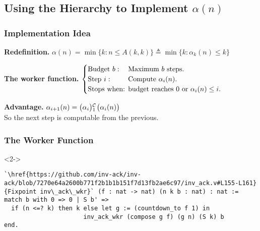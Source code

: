 \subsection{Using the Hierarchy to Implement $\alpha(n)$}
\begin{frame}
\frametitle{Implementation Idea}
\textbf{Redefinition.}
$
\alpha(n) = \min\{k: n\le A(k, k) \} \triangleq \min\{k: \alpha_k(n)\le k \}
$

\bigskip

\pause 
\textbf{The worker function.} $\begin{cases}
\text{Budget } b: & \hspace{-1em}\text{Maximum } b \text{ steps. } \\
\text{Step } i: & \hspace{-1em}\text{Compute } \alpha_i(n). \\
\text{Stops when: } & \hspace{-1em}\text{budget reaches } 0 \text{ or } \alpha_i(n) \le i.
\end{cases}$


\bigskip

\pause 
\textbf{Advantage.} $\alpha_{i+1}(n) = \cdt{\big(\alpha_i\big)}{1}\big(\alpha_i(n)\big)$\\
\smallskip
So the next step is computable from the previous.
\end{frame}


\begin{frame}[fragile]
\frametitle{The Worker Function}


\bigskip

\begin{overlayarea}{\linewidth}{3cm}
\begin{onlyenv}<2->
	\begin{lstlisting}
`\href{https://github.com/inv-ack/inv-ack/blob/7270e64a2600b771f2b1b1b151f7d13fb2ae6c97/inv_ack.v#L155-L161} {Fixpoint inv\_ack\_wkr}` (f : nat -> nat) (n k b : nat) : nat :=
match b with 0 => 0 | S b' =>
  if (n <=? k) then k else let g := (countdown_to f 1) in
                      inv_ack_wkr (compose g f) (g n) (S k) b
end.
\end{lstlisting}
\end{onlyenv}
\end{overlayarea}

\end{frame}



